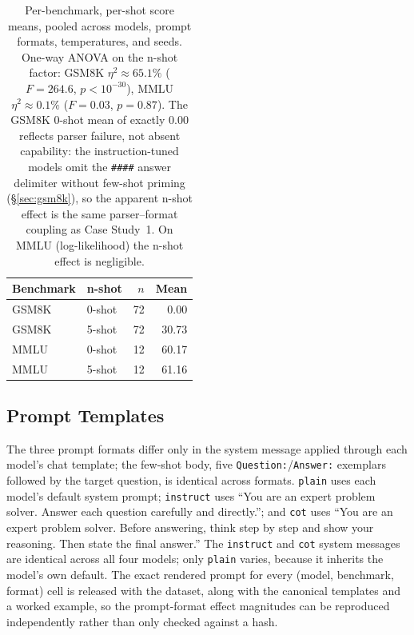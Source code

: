 \documentclass[11pt]{article}
\begin{document}
\begin{table}[h]
\centering
\small
\begin{tabular}{llrr}
\toprule
Benchmark & n-shot & $n$ & Mean \\
\midrule
GSM8K & 0-shot & 72 & ~~0.00 \\
GSM8K & 5-shot & 72 & 30.73 \\
\midrule
MMLU  & 0-shot & 12 & 60.17 \\
MMLU  & 5-shot & 12 & 61.16 \\
\bottomrule
\end{tabular}
\caption{Per-benchmark, per-shot score means, pooled across models, prompt
formats, temperatures, and seeds. One-way ANOVA on the n-shot factor:
GSM8K \(\eta^2 \approx 65.1\%\) (\(F = 264.6\), \(p < 10^{-30}\)), MMLU
\(\eta^2 \approx 0.1\%\) (\(F = 0.03\), \(p = 0.87\)). The GSM8K 0-shot
mean of exactly 0.00 reflects parser failure, not absent capability: the
instruction-tuned models omit the \texttt{\#\#\#\#} answer delimiter
without few-shot priming (\S\ref{sec:gsm8k}), so the apparent n-shot effect
is the same parser--format coupling as Case Study~1. On MMLU
(log-likelihood) the n-shot effect is negligible.}
\label{tab:anova-nshot}
\end{table}


\subsection{Prompt Templates}
\label{app:prompts}

The three prompt formats differ only in the system message applied through each
model's chat template; the few-shot body, five \texttt{Question:}/\texttt{Answer:}
exemplars followed by the target question, is identical across formats.
\texttt{plain} uses each model's default system prompt; \texttt{instruct} uses
``You are an expert problem solver. Answer each question carefully and
directly.''; and \texttt{cot} uses ``You are an expert problem solver. Before
answering, think step by step and show your reasoning. Then state the final
answer.'' The \texttt{instruct} and \texttt{cot} system messages are identical
across all four models; only \texttt{plain} varies, because it inherits the
model's own default. The exact rendered prompt for every (model, benchmark,
format) cell is released with the dataset, along with the canonical templates and
a worked example, so the prompt-format effect magnitudes can be reproduced
independently rather than only checked against a hash.
\end{document}
